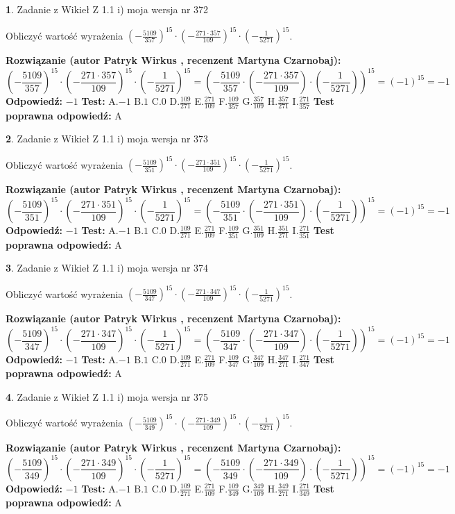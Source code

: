 \documentclass[12pt, a4paper]{article}
\theoremstyle{definition} %
\newtheorem{zad}{}
\newcommand{\zadStart}[1]{\begin{zad}#1\newline}
\newcommand{\zadStop}{\end{zad}}
\newcommand{\rozwStart}[2]{\noindent \textbf{Rozwiązanie (autor #1 , recenzent #2): }\newline}
\newcommand{\rozwStop}{\newline}
\newcommand{\odpStart}{\noindent \textbf{Odpowiedź:}\newline}
\newcommand{\odpStop}{\newline}
\newcommand{\testStart}{\noindent \textbf{Test:}\newline}
\newcommand{\testStop}{\newline}
\newcommand{\kluczStart}{\noindent \textbf{Test poprawna odpowiedź:}\newline}
\newcommand{\kluczStop}{\newline}
\begin{document}
\zadStart{Zadanie z Wikieł Z 1.1 i) moja wersja nr 372}

Obliczyć wartość wyrażenia $(-\frac{5109}{357})^{15} \cdot (-\frac{271 \cdot 357}{109})^{15} \cdot (-\frac{1}{5271})^{15}$.
\zadStop
\rozwStart{Patryk Wirkus}{Martyna Czarnobaj}
$$(-\frac{5109}{357})^{15} \cdot (-\frac{271 \cdot 357}{109})^{15} \cdot (-\frac{1}{5271})^{15} = (-\frac{5109}{357} \cdot (-\frac{271 \cdot 357}{109}) \cdot (-\frac{1}{5271}))^{15} = (-1)^{15} = -1$$
\rozwStop
\odpStart
$-1$
\odpStop
\testStart
A.$-1$ B.$1$ C.$0$ D.$\frac{109}{271}$ E.$\frac{271}{109}$
F.$\frac{109}{357}$ G.$\frac{357}{109}$
H.$\frac{357}{271}$
I.$\frac{271}{357}$
\testStop
\kluczStart
A
\kluczStop



\zadStart{Zadanie z Wikieł Z 1.1 i) moja wersja nr 373}

Obliczyć wartość wyrażenia $(-\frac{5109}{351})^{15} \cdot (-\frac{271 \cdot 351}{109})^{15} \cdot (-\frac{1}{5271})^{15}$.
\zadStop
\rozwStart{Patryk Wirkus}{Martyna Czarnobaj}
$$(-\frac{5109}{351})^{15} \cdot (-\frac{271 \cdot 351}{109})^{15} \cdot (-\frac{1}{5271})^{15} = (-\frac{5109}{351} \cdot (-\frac{271 \cdot 351}{109}) \cdot (-\frac{1}{5271}))^{15} = (-1)^{15} = -1$$
\rozwStop
\odpStart
$-1$
\odpStop
\testStart
A.$-1$ B.$1$ C.$0$ D.$\frac{109}{271}$ E.$\frac{271}{109}$
F.$\frac{109}{351}$ G.$\frac{351}{109}$
H.$\frac{351}{271}$
I.$\frac{271}{351}$
\testStop
\kluczStart
A
\kluczStop



\zadStart{Zadanie z Wikieł Z 1.1 i) moja wersja nr 374}

Obliczyć wartość wyrażenia $(-\frac{5109}{347})^{15} \cdot (-\frac{271 \cdot 347}{109})^{15} \cdot (-\frac{1}{5271})^{15}$.
\zadStop
\rozwStart{Patryk Wirkus}{Martyna Czarnobaj}
$$(-\frac{5109}{347})^{15} \cdot (-\frac{271 \cdot 347}{109})^{15} \cdot (-\frac{1}{5271})^{15} = (-\frac{5109}{347} \cdot (-\frac{271 \cdot 347}{109}) \cdot (-\frac{1}{5271}))^{15} = (-1)^{15} = -1$$
\rozwStop
\odpStart
$-1$
\odpStop
\testStart
A.$-1$ B.$1$ C.$0$ D.$\frac{109}{271}$ E.$\frac{271}{109}$
F.$\frac{109}{347}$ G.$\frac{347}{109}$
H.$\frac{347}{271}$
I.$\frac{271}{347}$
\testStop
\kluczStart
A
\kluczStop



\zadStart{Zadanie z Wikieł Z 1.1 i) moja wersja nr 375}

Obliczyć wartość wyrażenia $(-\frac{5109}{349})^{15} \cdot (-\frac{271 \cdot 349}{109})^{15} \cdot (-\frac{1}{5271})^{15}$.
\zadStop
\rozwStart{Patryk Wirkus}{Martyna Czarnobaj}
$$(-\frac{5109}{349})^{15} \cdot (-\frac{271 \cdot 349}{109})^{15} \cdot (-\frac{1}{5271})^{15} = (-\frac{5109}{349} \cdot (-\frac{271 \cdot 349}{109}) \cdot (-\frac{1}{5271}))^{15} = (-1)^{15} = -1$$
\rozwStop
\odpStart
$-1$
\odpStop
\testStart
A.$-1$ B.$1$ C.$0$ D.$\frac{109}{271}$ E.$\frac{271}{109}$
F.$\frac{109}{349}$ G.$\frac{349}{109}$
H.$\frac{349}{271}$
I.$\frac{271}{349}$
\testStop
\kluczStart
A
\kluczStop
\end{document}
